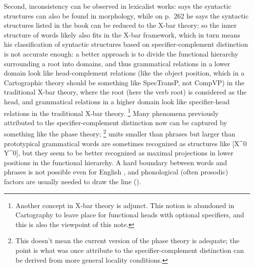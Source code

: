 \documentclass[UTF8, a4paper, oneside, scheme=plain, 12pt]{ctexrep}
\newcommand*{\citepage}[1]{p.~{#1}}
\newcommand*{\citepages}[1]{pp.~{#1}}
\begin{document}
{Second, inconsistency can be observed in lexicalist works:
\citet[\citepages{242}]{deng2010formal} says the syntactic structures 
can also be found in morphology,
while on \citepage{262} he says 
the syntactic structures listed in the book 
can be reduced to the X-bar theory;
so the inner structure of words likely
also fits in the X-bar framework,
which in turn means his classification of syntactic structures 
based on specifier-complement distinction is not accurate enough:
a better approach is to divide the functional hierarchy surrounding a root into domains, 
and thus grammatical relations in a lower domain look like 
head-complement relations (like the object position, 
which in a Cartographic theory should be something like SpecTransP, 
not CompVP) in the traditional X-bar theory, 
where the root (here the verb root) is considered as the head,
and grammatical relations in a higher domain look like 
specifier-head relations in the traditional X-bar theory.%
\footnote{
    Another concept in X-bar theory is adjunct.
    This notion is abandoned in Cartography 
    to leave place for functional heads with optional specifiers, 
    and this is also the viewpoint of this note.
}
Many phenomena previously attributed to the specifier-complement distinction 
now can be captured by something like the phase theory;%
\footnote{
    This doesn't mean the current version of the phase theory 
    is adequate; the point is what was once attribute to the specifier-complement distinction
    can be derived from more general locality conditions. 
}
units smaller than phrases 
but larger than prototypical grammatical words 
are sometimes recognized as structures like [X^0 Y^0],
but they seem to be better recognized as 
maximal projections in lower positions in the functional hierarchy.
A hard boundary between words and phrases 
is not possible even for English \citep{bruening2018lexicalist},
and phonological (often prosodic) factors are usually needed to draw the line 
().

}
\end{document}
